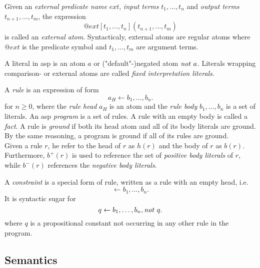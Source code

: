 \begin{definition}
\label{def:prelims-asp-syntax-ext-atom}
Given an \emph{external predicate name} $\mathit{ext}$, \emph{input terms} $t_1,\ldots,t_n$ and \emph{output terms} $t_{n+1},\ldots,t_m$, the expression
\[
	@\mathit{ext}[t_1,\ldots,t_n](t_{n+1},\ldots,t_m)
\]
is called an \emph{external atom}. Syntacticaly, external atoms are regular atoms where $@\mathit{ext}$ is the predicate symbol and $t_1,\ldots,t_m$ are argument terms.
\end{definition}

\begin{definition}[Literal]
\label{def:prelims-asp-syntax-literal}
A literal in \gls{asp} is an atom $a$ or ("default"-)negated atom $\mathit{not}\ a$. Literals wrapping comparison- or external atoms are called \emph{fixed interpretation literals}.
\end{definition}

\begin{definition}
\label{def:prelims-asp-syntax-rule}
A \emph{rule} is an expression of form
\[
	a_H \leftarrow b_1,\ldots,b_n.
\]
for $n \geq 0$, where the \emph{rule head} $a_H$ is an atom and the \emph{rule body} $b_1,\ldots,b_n$ is a set of literals. An \gls{asp} \emph{program} is a set of rules. A rule with an empty body is called a \emph{fact}. A rule is \emph{ground} if both its head atom and all of its body literals are ground. By the same reasoning, a program is ground if all of its rules are ground.\\
Given a rule $r$, he refer to the head of $r$ as $h(r)$ and the body of $r$ as $b(r)$. Furthermore, $b^+(r)$ is used to reference the set of \emph{positive body literals} of $r$, while $b^-(r)$ references the \emph{negative body literals}. 
\end{definition}

\begin{definition}[Constraint]
\label{def:prelims-asp-syntax-constraint}
A \emph{constraint} is a special form of rule, written as a rule with an empty head, i.e.
\[
	\leftarrow b_1,\ldots,b_n.
\]
It is syntactic sugar for
\[
	q \leftarrow b_1,\ldots,b_n, \mathit{not}\ q.
\]
where $q$ is a propositional constant not occurring in any other rule in the program.
\end{definition}

\subsection{Semantics}
\label{subsec:prelims-asp-semantics}

